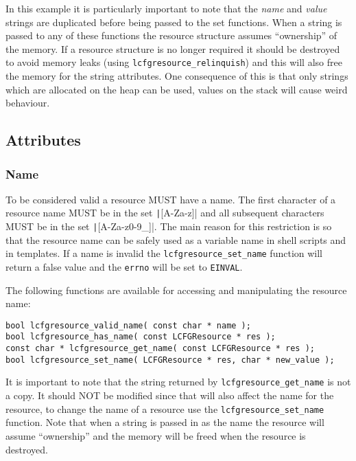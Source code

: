 \documentclass[11pt,a4paper,titlepage]{article}
\begin{document}
In this example it is particularly important to note that the
\textit{name} and \textit{value} strings are duplicated before being
passed to the set functions. When a string is passed to any of these
functions the resource structure assumes ``ownership'' of the
memory. If a resource structure is no longer required it should be
destroyed to avoid memory leaks (using
\texttt{lcfgresource\_relinquish}) and this will also free the
memory for the string attributes. One consequence of this is that only
strings which are allocated on the heap can be used, values on the
stack will cause weird behaviour.

\subsection{Attributes}

\subsubsection{Name}
\label{subsec:res_name}

To be considered valid a resource MUST have a name. The first
character of a resource name MUST be in the set \texttt|[A-Za-z]| and
all subsequent characters MUST be in the set
\texttt|[A-Za-z0-9_]|. The main reason for this restriction is so that
the resource name can be safely used as a variable name in shell
scripts and in templates. If a name is invalid the
\texttt{lcfgresource\_set\_name} function will return a false value
and the \texttt{errno} will be set to \texttt{EINVAL}.

The following functions are available for accessing and manipulating
the resource name:

\begin{verbatim}
bool lcfgresource_valid_name( const char * name );
bool lcfgresource_has_name( const LCFGResource * res );
const char * lcfgresource_get_name( const LCFGResource * res );
bool lcfgresource_set_name( LCFGResource * res, char * new_value );
\end{verbatim}

It is important to note that the string returned by
\texttt{lcfgresource\_get\_name} is not a copy. It should NOT be
modified since that will also affect the name for the resource, to
change the name of a resource use the \texttt{lcfgresource\_set\_name}
function. Note that when a string is passed in as the name the
resource will assume ``ownership'' and the memory will be freed when
the resource is destroyed.
\end{document}
